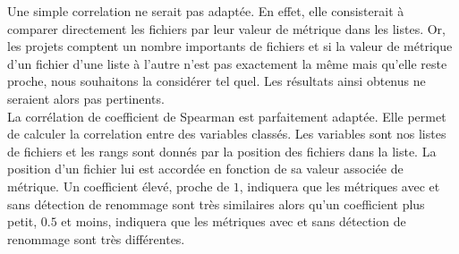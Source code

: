 Une simple correlation ne serait pas adaptée. En effet, elle consisterait à comparer directement les fichiers par leur valeur de métrique dans les listes. Or, les projets comptent un nombre importants de fichiers et si la valeur de métrique d'un fichier d'une liste à l'autre n'est pas exactement la même mais qu'elle reste proche, nous souhaitons la considérer tel quel. Les résultats ainsi obtenus ne seraient alors pas pertinents. \\ 

La corrélation de coefficient de Spearman est parfaitement adaptée. Elle permet de calculer la correlation entre des variables classés. Les variables sont nos listes de fichiers et les rangs sont donnés par la position des fichiers dans la liste. La position d'un fichier lui est accordée en fonction de sa valeur associée de métrique. Un coefficient élevé, proche de $1$, indiquera que les métriques avec et sans détection de renommage sont très similaires alors qu'un coefficient plus petit, $0.5$ et moins, indiquera que les métriques avec et sans détection de renommage sont très différentes.\\  
